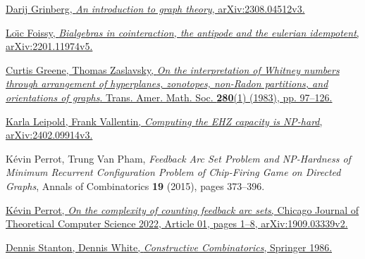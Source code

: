\documentclass[numbers=enddot,12pt,final,onecolumn,notitlepage]{scrartcl}%
\theoremstyle{definition}
\theoremstyle{plainsl}
\begin{document}
\begin{thebibliography}{99999999}                                                                                         %


\href{https://arxiv.org/abs/2308.04512v3}{Darij Grinberg,
\textit{An introduction to graph theory}, arXiv:2308.04512v3.}

%
\href{https://arxiv.org/abs/2201.11974v5}{Lo\"{\i}c Foissy, \textit{Bialgebras
in cointeraction, the antipode and the eulerian idempotent},
arXiv:2201.11974v5.}

%
\href{https://doi.org/10.1090/S0002-9947-1983-0712251-1}{Curtis Greene, Thomas
Zaslavsky, \textit{On the interpretation of Whitney numbers through
arrangement of hyperplanes, zonotopes, non-Radon partitions, and orientations
of graphs}. Trans. Amer. Math. Soc. \textbf{280}(1) (1983), pp. 97--126.}

\href{https://arxiv.org/abs/2402.09914v3}{Karla
Leipold, Frank Vallentin, \textit{Computing the EHZ capacity is NP-hard},
arXiv:2402.09914v3.}

K\'{e}vin Perrot, Trung Van Pham, \textit{Feedback
Arc Set Problem and NP-Hardness of Minimum Recurrent Configuration Problem of
Chip-Firing Game on Directed Graphs}, Annals of Combinatorics \textbf{19}
(2015), pages 373--396.

%
\href{https://arxiv.org/abs/1909.03339v2}{K\'{e}vin Perrot, \textit{On the
complexity of counting feedback arc sets}, Chicago Journal of Theoretical
Computer Science 2022, Article 01, pages 1--8, arXiv:1909.03339v2.}

%
\href{https://doi.org/10.1007/978-1-4612-4968-9}{Dennis Stanton, Dennis White,
\textit{Constructive Combinatorics}, Springer 1986.}
\end{thebibliography}
\end{document}

